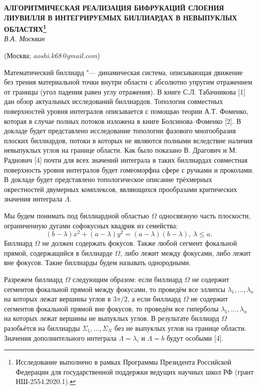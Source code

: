 \begin{center}
    {\bf АЛГОРИТМИЧЕСКАЯ РЕАЛИЗАЦИЯ БИФРУКАЦИЙ СЛОЕНИЯ ЛИУВИЛЛЯ В ИНТЕГРИРУЕМЫХ
    БИЛЛИАРДАХ В НЕВЫПУКЛЫХ ОБЛАСТЯХ\footnote{Исследование выполнено в рамках Программы Президента Российской Федерации для государственной поддержки ведущих научных школ РФ (грант НШ-2554.2020.1).}}\\

    {\it В.А. Москвин}

    (Москва; {\it aoshi.k68@gmail.com})
\end{center}

Математический биллиард "--- динамическая система, опи\-сы\-вающая движение без трения материальной точки внутри области с абсолютно упругим отражением от границы (угол падения равен углу отражения). В книге С.Л. Табач\-никова [1] дан обзор актуальных исследований биллиардов. Тополо\-гия совместных поверхностей уровня интег\-ралов опи\-сывается с помощью теории А.Т. Фоменко, которая в случае полных потоков изло\-жена в книге Болсинова--Фоменко [2]. В докладе будет пред\-став\-лено ис\-следование топологии фазового много\-образия плос\-ких бил\-лиардов, потоки в которых не являются полными вследствие наличия не\-выпук\-лых углов на границе области. Как было показано В. Драгович и М. Раднович [4] почти для всех значений интеграла в таких биллиардах совместная поверхность уровня интегралов будет гомеоморфна сфере с ручками и проколами. В докладе будет пред\-ставлено топ\-олог\-ичес\-кое описание трёхмерных ок\-рест\-ностей дву\-мерных ком\-плек\-сов, являющихся прообразами критичес\-ких значения интеграла $\Lambda$.


Мы будем понимать под биллиардной областью $\Omega$ однос\-вязную часть плоскости, ограниченную дугами софокусных квадрик из семейства:
$$(b-\lambda)x^2+(a-\lambda)y^2=(a-\lambda)(b-\lambda),~\lambda \leq a. $$
Биллиард $\Omega$ не должен содержать фокусов. Также любой сегмент фокальной прямой, содержащийся в биллиарде $\Omega$, либо лежит между фокусами, либо лежит вне фокусов. Такие биллиарды будем называть однородными.

Разрежем биллиард $\Omega$ следующим образом: если биллиард $\Omega$ не содержит сегментов фокальной прямой между фокусами, то проведём все эллипсы $\lambda_1, \ldots, \lambda_n$ на которых лежат вершины углов в $3\pi/2$, а если биллиард $\Omega$ не содержит сегментов фокальной прямой вне фокусов, то проведём все гиперболы $\lambda_1, \ldots, \lambda_n$ на которых лежат вершины не выпуклых углов. В результате биллиард $\Omega$ разобьётся на биллиарды $\Sigma_1, \ldots, \Sigma_N$ без не выпуклых углов на границе области. Значения допол\-нитель\-ного интеграла $\Lambda = \lambda_i$ и $\Lambda = b$ будут особыми [4].

